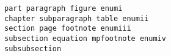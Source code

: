 \documentclass{article}
\begin{document}
\begin{verbatim}
part paragraph figure enumi
chapter subparagraph table enumii
section page footnote enumiii
subsection equation mpfootnote enumiv
subsubsection
\end{verbatim}



















\end{document}
